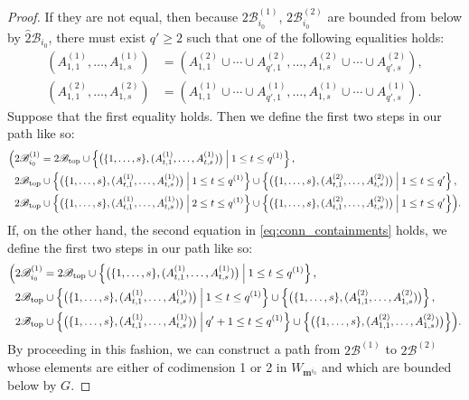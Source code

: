 \documentclass[11pt]{amsart}
\theoremstyle{definition}
\theoremstyle{remark}
\theoremstyle{plain}
\newcommand\bm{\mathbf{m}}
\newcommand{\stB}{2\mathscr{B}}
\newcommand{\on}{\operatorname}
\renewcommand{\top}{{\on{top}}}
\newcommand{\wh}{\widehat}
\begin{document}
\begin{proof}
If they are not equal, then because $\stB^{(1)}_{i_0}$, $\stB^{(2)}_{i_0}$ are bounded from below by $\wh\stB_{i_0}$, there must exist $q' \geq 2$ such that one of the following equalities holds:
\begin{align}
\label{eq:conn_containments}
(A^{(1)}_{1,1},\ldots,A^{(1)}_{1,s}) &= (A^{(2)}_{1,1}\cup\cdots\cup A^{(2)}_{q',1},\ldots,A^{(2)}_{1,s}\cup\cdots\cup A^{(2)}_{q',s}), \\
(A^{(2)}_{1,1},\ldots,A^{(2)}_{1,s}) &= (A^{(1)}_{1,1}\cup\cdots\cup A^{(1)}_{q',1},\ldots,A^{(1)}_{1,s}\cup\cdots\cup A^{(1)}_{q',s}).
\nonumber
\end{align}
Suppose that the first equality holds.
Then we define the first two steps in our path like so:
\begin{align}
\Bigl(&\stB^{(1)}_{i_0} = \stB_\top \cup \left\{\bigl(\{1,\ldots,s\},(A^{(1)}_{t,1},\ldots,A^{(1)}_{t,s})\bigr) \:\Big|\: 1 \leq t \leq q^{(1)}\right\}, \\
& \stB_\top \cup \left\{\bigl(\{1,\ldots,s\},(A^{(1)}_{t,1},\ldots,A^{(1)}_{t,s})\bigr) \:\Big|\: 1 \leq t \leq q^{(1)}\right\} \cup \left\{\bigl(\{1,\ldots,s\},(A^{(2)}_{t,1},\ldots,A^{(2)}_{t,s})\bigr) \:\Big|\: 1 \leq t \leq q'\right\},
\nonumber\\
& \stB_\top \cup \left\{\bigl(\{1,\ldots,s\},(A^{(1)}_{t,1},\ldots,A^{(1)}_{t,s})\bigr) \:\Big|\: 2 \leq t \leq q^{(1)}\right\} \cup \left\{\bigl(\{1,\ldots,s\},(A^{(2)}_{t,1},\ldots,A^{(2)}_{t,s})\bigr) \:\Big|\: 1 \leq t \leq q'\right\}\Bigr).
\nonumber
\end{align}
If, on the other hand, the second equation in \eqref{eq:conn_containments} holds, we define the first two steps in our path like so:
\begin{align}
\Bigl(&\stB^{(1)}_{i_0} = \stB_\top \cup \left\{\bigl(\{1,\ldots,s\},(A^{(1)}_{t,1},\ldots,A^{(1)}_{t,s})\bigr) \:\Big|\: 1 \leq t \leq q^{(1)}\right\}, \\
& \stB_\top \cup \left\{\bigl(\{1,\ldots,s\},(A^{(1)}_{t,1},\ldots,A^{(1)}_{t,s})\bigr) \:\Big|\: 1 \leq t \leq q^{(1)}\right\} \cup \left\{\bigl(\{1,\ldots,s\},(A^{(2)}_{1,1},\ldots,A^{(2)}_{1,s})\bigr)\right\},
\nonumber\\
& \stB_\top \cup \left\{\bigl(\{1,\ldots,s\},(A^{(1)}_{t,1},\ldots,A^{(1)}_{t,s})\bigr) \:\Big|\: q'+1 \leq t \leq q^{(1)}\right\} \cup \left\{\bigl(\{1,\ldots,s\},(A^{(2)}_{1,1},\ldots,A^{(2)}_{1,s})\bigr)\right\}\Bigr).
\nonumber
\end{align}
By proceeding in this fashion, we can construct a path from $\stB^{(1)}$ to $\stB^{(2)}$ whose elements are either of codimension 1 or 2 in $W_{\bm^{i_0}}$
and which are bounded below by $G$.


\end{proof}
\end{document}
